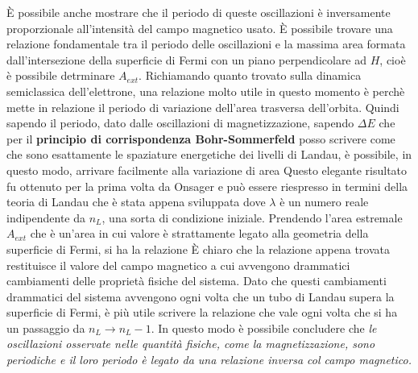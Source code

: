 \`E possibile anche mostrare che il periodo di queste oscillazioni \`e inversamente proporzionale all'intensit\`a del campo magnetico usato. \`E possibile trovare una relazione fondamentale tra il periodo delle oscillazioni e la massima area formata dall'intersezione della superficie di Fermi con un piano perpendicolare ad $H$, cio\`e \`e possibile detrminare $A_{ext}$. Richiamando quanto trovato sulla dinamica semiclassica dell'elettrone, una relazione molto utile in questo momento \`e
perch\`e mette in relazione il periodo di variazione dell'area trasversa dell'orbita. Quindi sapendo il periodo, dato dalle oscillazioni di magnetizzazione, sapendo $\Delta E$ che per il \textbf{principio di corrispondenza Bohr-Sommerfeld} posso scrivere come
che sono esattamente le spaziature energetiche dei livelli di Landau, \`e possibile, in questo modo, arrivare facilmente alla variazione di area
Questo elegante risultato fu ottenuto per la prima volta da Onsager e pu\`o essere riespresso in termini della teoria di Landau che \`e stata appena sviluppata
dove $\lambda$ \`e un numero reale indipendente da $n_L$, una sorta di condizione iniziale. Prendendo l'area estremale $A_{ext}$ che \`e un'area in cui valore \`e strattamente legato alla geometria della superficie di Fermi, si ha la relazione
\`E chiaro che la relazione appena trovata restituisce il valore del campo magnetico a cui avvengono drammatici cambiamenti delle propriet\`a fisiche del sistema. Dato che questi cambiamenti drammatici del sistema avvengono ogni volta che un tubo di Landau supera la superficie di Fermi, \`e pi\`u utile scrivere la relazione
che vale ogni volta che si ha un passaggio da $n_L \to n_L-1$. In questo modo \`e possibile concludere che \textit{le oscillazioni osservate nelle quantit\`a fisiche, come la magnetizzazione, sono periodiche e il loro periodo \`e legato da una relazione inversa col campo magnetico.}
